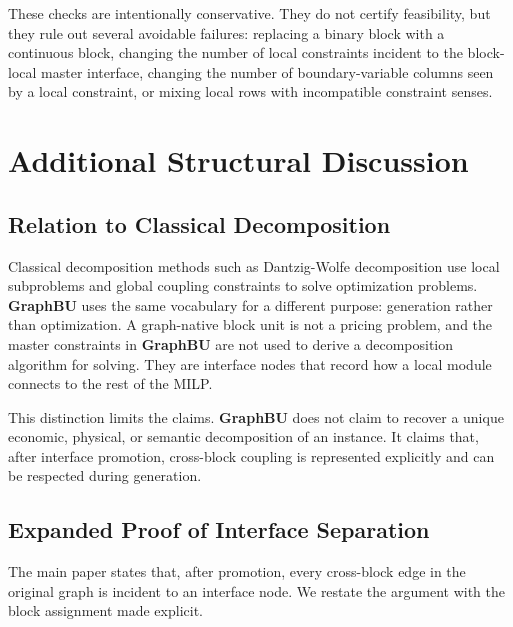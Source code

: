 \documentclass[letterpaper]{article}
\newcommand{\method}{\textbf{GraphBU}\xspace}
\begin{document}
These checks are intentionally conservative. They do not certify
feasibility, but they rule out several avoidable failures: replacing a
binary block with a continuous block, changing the number of local
constraints incident to the block-local master interface, changing the
number of boundary-variable columns seen by a local constraint, or
mixing local rows with incompatible constraint senses.

\section{Additional Structural Discussion}

\subsection{Relation to Classical Decomposition}

Classical decomposition methods such as Dantzig-Wolfe decomposition use
local subproblems and global coupling constraints to solve optimization
problems. \method uses the same vocabulary for a different purpose:
generation rather than optimization. A graph-native block unit is not a
pricing problem, and the master constraints in \method are not used to
derive a decomposition algorithm for solving. They are interface nodes
that record how a local module connects to the rest of the MILP.

This distinction limits the claims. \method does
not claim to recover a unique economic, physical, or semantic
decomposition of an instance. It claims that, after interface promotion,
cross-block coupling is represented explicitly and can be respected
during generation.

\subsection{Expanded Proof of Interface Separation}

The main paper states that, after promotion, every cross-block edge in
the original graph is incident to an interface node. We restate the
argument with the block assignment made explicit.
\end{document}
